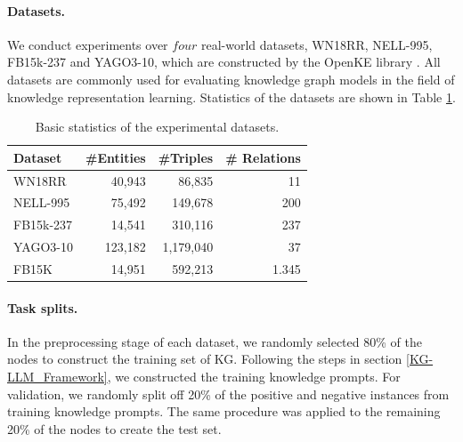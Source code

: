 \documentclass[pmlr]{jmlr}%
\begin{document}
\paragraph{Datasets.}We conduct experiments over $four$ real-world datasets, WN18RR, NELL-995, FB15k-237 and YAGO3-10, which are constructed by the OpenKE library \citep{OpenKE}. All datasets are commonly used for evaluating knowledge graph models in the field of knowledge representation learning. Statistics of the datasets are shown in Table \ref{dataset_table}.

\begin{table}[t]
  \caption{Basic statistics of the experimental datasets.}
  \label{dataset_table}
  \centering
  \begin{tabular}{lrrr}
    \toprule
    Dataset    &\#Entities & \#Triples &\# Relations\\
    \midrule
    WN18RR & 40,943 & 86,835      & 11\\
    NELL-995  & 75,492    & 149,678      & 200 \\
    FB15k-237 & 14,541    & 310,116      & 237 \\
    YAGO3-10  & 123,182   & 1,179,040    & 37 \\
    FB15K     & 14,951    & 592,213      & 1.345 \\ 
    \bottomrule
  \end{tabular}
\end{table}

\paragraph{Task splits.} In the preprocessing stage of each dataset, we randomly selected 80\% of the nodes to construct the training set of KG. Following the steps in section \ref{KG-LLM_Framework}, we constructed the training knowledge prompts. For validation, we randomly split off 20\% of the positive and negative instances from training knowledge prompts. The same procedure was applied to the remaining 20\% of the nodes to create the test set.
\end{document}
